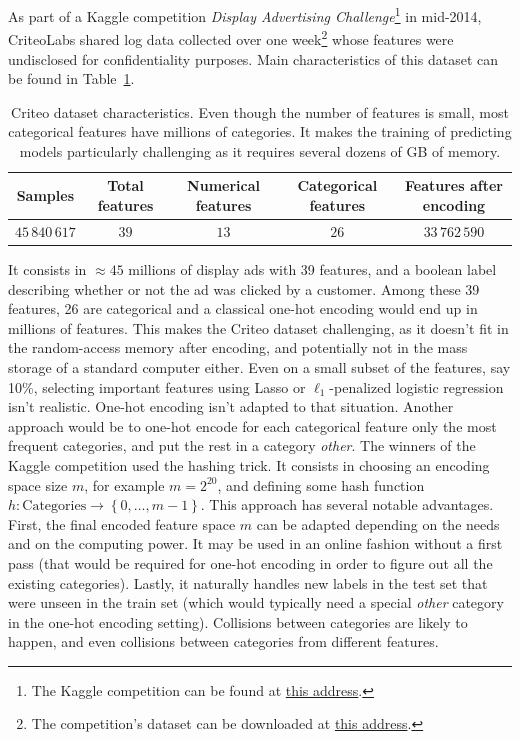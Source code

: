 As part of a Kaggle competition \emph{Display Advertising Challenge}\footnote{
    The Kaggle competition can be found at
    \href{https://www.kaggle.com/c/criteo-display-ad-challenge}{this address}.
}
in mid-2014, CriteoLabs shared log data collected over one week\footnote{
    The competition's dataset can be downloaded at
    \href{https://labs.criteo.com/2014/02/download-kaggle-display-advertising-challenge-dataset/}{this address}.
}
whose features were undisclosed for confidentiality purposes.
Main characteristics of this dataset can be found in Table~\ref{tab:criteo_dataset}.
\begin{table}[!htb]
    \centering
    \setlength{\tabcolsep}{2pt}
    {\small
    \begin{tabular}{|c|c|c|c|c|}\hline
    \textbf{Samples} & \textbf{Total features} & \textbf{Numerical features} & \textbf{Categorical features} & \textbf{Features after encoding}\\ \hline
    $45\,840\,617$ & $39$  & $13$ & $26$ & $33\,762\,590$ \\ \hline
    \end{tabular}
    }%
    \caption[short]{
        Criteo dataset characteristics.
        Even though the number of features is small,
        most categorical features have millions of categories.
        It makes the training of predicting models particularly challenging as it requires several
        dozens of GB of memory.
    }
    \label{tab:criteo_dataset}
\end{table}
It consists in $\approx 45$ millions of display ads with 39 features,
and a boolean label describing whether or not the ad was clicked by a customer.
Among these 39 features, 26 are categorical and a classical one-hot encoding would end up in millions of features.
This makes the Criteo dataset challenging, as it doesn't fit in the random-access memory after encoding,
and potentially not in the mass storage of a standard computer either.
Even on a small subset of the features, say 10\%,
selecting important features using Lasso or $\ell_1$-penalized logistic regression isn't realistic.
One-hot encoding isn't adapted to that situation.
Another approach would be to one-hot encode for each categorical feature only the most frequent categories,
and put the rest in a category \textit{other}.
The winners of the Kaggle competition used the hashing trick.
It consists in choosing an encoding space size $m$,
for example $m = 2^{20}$,
and defining some hash function $h \colon \text{Categories} \to \left\{ 0, \dots, m - 1 \right\}$.
This approach has several notable advantages.
First, the final encoded feature space $m$ can be adapted depending on the needs and on the computing power.
It may be used in an online fashion without a first pass
(that would be required for one-hot encoding in order to figure out all the existing categories).
Lastly, it naturally handles new labels in the test set that were unseen in the train set
(which would typically need a special \textit{other} category in the one-hot encoding setting).
Collisions between categories are likely to happen,
and even collisions between categories from different features.

